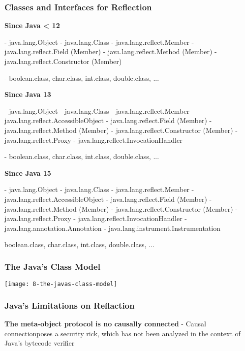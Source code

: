 \subsubsection{Classes and Interfaces for Reflection}

\textbf{Since Java < 12}

- java.lang.Object
	- java.lang.Class
	- java.lang.reflect.Member
		- java.lang.reflect.Field (Member)
		- java.lang.reflect.Method (Member)
		- java.lang.reflect.Constructor (Member)

- boolean.class, char.class, int.class, double.class, ...

\textbf{Since Java 13}

- java.lang.Object
	- java.lang.Class
	- java.lang.reflect.Member
	- java.lang.reflect.AccessibleObject
		- java.lang.reflect.Field (Member)
		- java.lang.reflect.Method (Member)
		- java.lang.reflect.Constructor (Member)
	- java.lang.reflect.Proxy
	- java.lang.reflect.InvocationHandler

- boolean.class, char.class, int.class, double.class, ...

\textbf{Since Java 15}

- java.lang.Object
	- java.lang.Class
	- java.lang.reflect.Member
	- java.lang.reflect.AccessibleObject
		- java.lang.reflect.Field (Member)
		- java.lang.reflect.Method (Member)
		- java.lang.reflect.Constructor (Member)
	- java.lang.reflect.Proxy
	- java.lang.reflect.InvocationHandler
	- java.lang.annotation.Annotation
	- java.lang.instrument.Instrumentation

boolean.class, char.class, int.class, double.class, ...

\subsubsection{The Java's Class Model}

\begin{center}
\texttt{[image: 8-the-javas-class-model]}
\end{center}

\subsubsection{Java's Limitations on Reflaction}

\textbf{The meta-object protocol is no causally connected}
	- Causal connectionposes a security rick, which has not been analyzed in the context of Java's bytecode verifier

